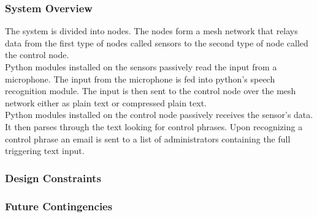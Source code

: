 \documentclass[11pt,a4paper]{article}
\begin{document}
\subsubsection{System Overview}
\textnormal{The system is divided into nodes.  The nodes form a mesh network that relays data from the first type of nodes called sensors to the second type of node called the control node. \\
Python modules installed on the sensors passively read the input from a microphone.  The input from the microphone is fed into python's speech recognition module.  The input is then sent to the control node over the mesh network either as plain text or compressed plain text. \\
Python modules installed on the control node passively receives the sensor's data.  It then parses through the text looking for control phrases.  Upon recognizing a control phrase an email is sent to a list of administrators containing the full triggering text input.}

\subsubsection{Design Constraints}

\subsubsection{Future Contingencies}
\end{document}
